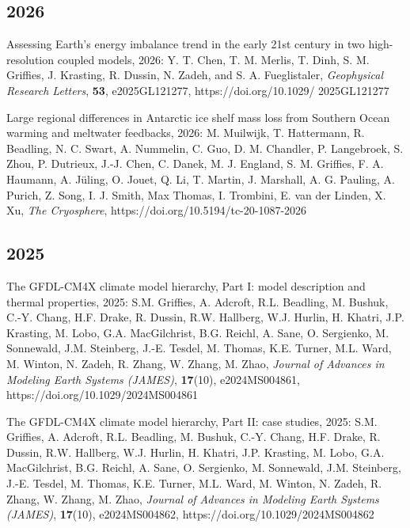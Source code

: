 \small 

\begin{etaremune}

\subsection*{\sc \color{Maroon} 2026}

\item Assessing Earth’s energy imbalance trend in the early 21st century in two high-resolution coupled models, 2026: Y. T. Chen, T. M. Merlis, T. Dinh, S. M. Grif\/f\/ies, J. Krasting, R. Dussin, N. Zadeh, and S. A. Fueglistaler, {\it Geophysical Research Letters}, {\bf 53},
e2025GL121277, https://doi.org/10.1029/
2025GL121277

\item Large regional differences in Antarctic ice shelf mass loss from Southern Ocean warming and meltwater feedbacks, 2026: M. Muilwijk, T. Hattermann, R. Beadling, N. C. Swart, A. Nummelin, C. Guo, D. M. Chandler, P. Langebroek, S. Zhou, P. Dutrieux, J.-J. Chen, C. Danek, M. J. England, S. M. Grif\/f\/ies, F. A. Haumann, A. {J\"{u}ling}, O. Jouet, Q. Li, T. Martin, J. Marshall, A. G. Pauling, A. Purich, Z. Song, I. J. Smith, Max Thomas, I. Trombini, E. van der Linden, X. Xu,  {\it The Cryosphere}, 
https://doi.org/10.5194/tc-20-1087-2026

\subsection*{\sc \color{Maroon} 2025}

\item The GFDL-CM4X climate model hierarchy, Part I: model description and thermal properties, 2025: S.M. Grif\/f\/ies, A. Adcroft, R.L. Beadling, M. Bushuk, C.-Y. Chang, H.F. Drake, R. Dussin, R.W. Hallberg, W.J. Hurlin, H. Khatri, J.P. Krasting, M. Lobo, G.A. MacGilchrist, B.G. Reichl, A. Sane, O. Sergienko, M. Sonnewald,  J.M. Steinberg, J.-E. Tesdel, M. Thomas, K.E. Turner, M.L. Ward, M. Winton, N. Zadeh, R. Zhang, W. Zhang, M. Zhao, {\it Journal of Advances in Modeling Earth Systems (JAMES)}, {\bf 17}(10), e2024MS004861, https://doi.org/10.1029/2024MS004861

\item The GFDL-CM4X climate model hierarchy, Part II: case studies, 2025: S.M. Grif\/f\/ies, A. Adcroft,  R.L. Beadling, M. Bushuk, C.-Y. Chang, H.F. Drake, R. Dussin, R.W. Hallberg, W.J. Hurlin, H. Khatri, J.P. Krasting, M. Lobo, G.A. MacGilchrist, B.G. Reichl, A. Sane, O. Sergienko, M. Sonnewald,  J.M. Steinberg, J.-E. Tesdel, M. Thomas, K.E. Turner, M.L. Ward, M. Winton, N. Zadeh, R. Zhang, W. Zhang, M. Zhao, {\it Journal of Advances in Modeling Earth Systems (JAMES)}, {\bf 17}(10),  e2024MS004862, https://doi.org/10.1029/2024MS004862


\end{etaremune}
